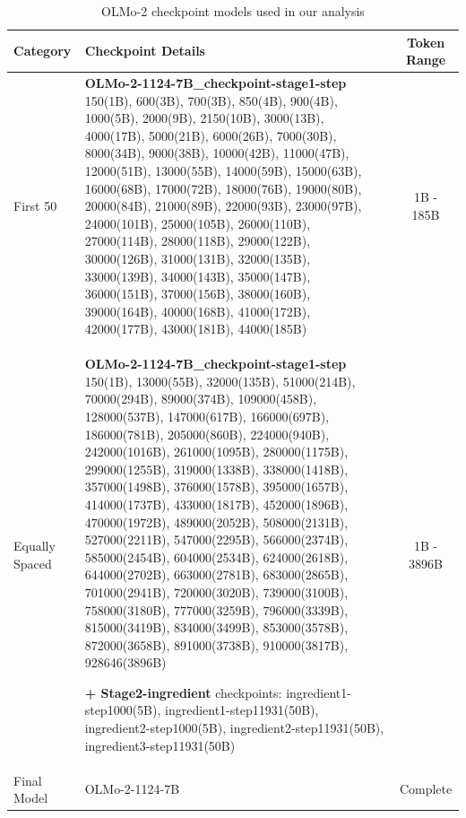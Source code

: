 \documentclass[10pt]{article}
\begin{document}



\begin{table}[ht]
\centering
\caption{OLMo-2 checkpoint models used in our analysis}
\label{tab:olmo2_checkpoints}
\small
\begin{tabular}{|p{2.5cm}|p{11cm}|c|}
\hline
\textbf{Category} & \textbf{Checkpoint Details} & \textbf{Token Range} \\
\hline
First 50 & \textbf{OLMo-2-1124-7B\_checkpoint-stage1-step} 150(1B), 600(3B), 700(3B), 850(4B), 900(4B), 1000(5B), 2000(9B), 2150(10B), 3000(13B), 4000(17B), 5000(21B), 6000(26B), 7000(30B), 8000(34B), 9000(38B), 10000(42B), 11000(47B), 12000(51B), 13000(55B), 14000(59B), 15000(63B), 16000(68B), 17000(72B), 18000(76B), 19000(80B), 20000(84B), 21000(89B), 22000(93B), 23000(97B), 24000(101B), 25000(105B), 26000(110B), 27000(114B), 28000(118B), 29000(122B), 30000(126B), 31000(131B), 32000(135B), 33000(139B), 34000(143B), 35000(147B), 36000(151B), 37000(156B), 38000(160B), 39000(164B), 40000(168B), 41000(172B), 42000(177B), 43000(181B), 44000(185B) & 1B - 185B \\
\hline
Equally Spaced & \textbf{OLMo-2-1124-7B\_checkpoint-stage1-step} 150(1B), 13000(55B), 32000(135B), 51000(214B), 70000(294B), 89000(374B), 109000(458B), 128000(537B), 147000(617B), 166000(697B), 186000(781B), 205000(860B), 224000(940B), 242000(1016B), 261000(1095B), 280000(1175B), 299000(1255B), 319000(1338B), 338000(1418B), 357000(1498B), 376000(1578B), 395000(1657B), 414000(1737B), 433000(1817B), 452000(1896B), 470000(1972B), 489000(2052B), 508000(2131B), 527000(2211B), 547000(2295B), 566000(2374B), 585000(2454B), 604000(2534B), 624000(2618B), 644000(2702B), 663000(2781B), 683000(2865B), 701000(2941B), 720000(3020B), 739000(3100B), 758000(3180B), 777000(3259B), 796000(3339B), 815000(3419B), 834000(3499B), 853000(3578B), 872000(3658B), 891000(3738B), 910000(3817B), 928646(3896B)

\textbf{+ Stage2-ingredient} checkpoints: ingredient1-step1000(5B), ingredient1-step11931(50B), ingredient2-step1000(5B), ingredient2-step11931(50B), ingredient3-step11931(50B) & 1B - 3896B \\
\hline
Final Model & OLMo-2-1124-7B & Complete \\
\hline
\end{tabular}
\end{table}
\end{document}
